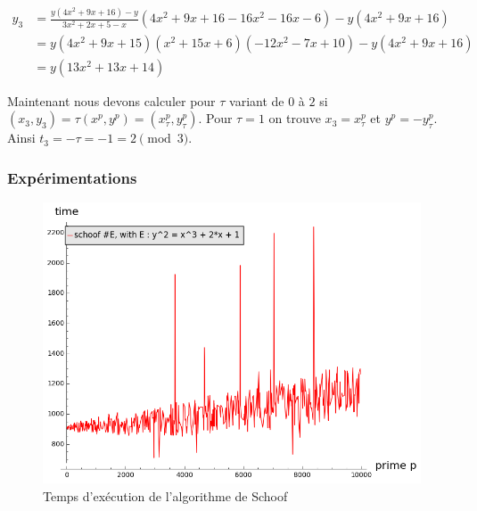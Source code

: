 \documentclass{article}
\begin{document}
\begin{align*}
y_3 &= \frac{y(4x^2+9x+16) - y}{3x^2 +2x +5 - x} (4x^2+9x+16 -  16x^2 - 16x - 6) - y(4x^2+9x+16) \\
	&= y(4x^2+9x+15)(x^2+15x+6)( -12x^2 - 7x +10 ) - y(4x^2+9x+16)\\
	&= y(13x^2 + 13x + 14)
\end{align*}

Maintenant nous devons calculer pour $\tau$ variant de $0$ à $2$ si $(x_3, y_3) = \tau (x^p, y^p)=(x_{\tau}^p, y_{\tau}^p)$. Pour $\tau = 1$ on trouve $x_3 = x_{\tau}^p$ et $y^p= - y_{\tau}^p$. Ainsi $t_3 = -\tau = -1 = 2 \pmod 3$. 

\newpage
\subsubsection{Expérimentations}

\begin{figure}[h!]
\includegraphics[scale=0.6]{pictures/schoof_cputime.png} 
\caption{Temps d'exécution de l'algorithme de Schoof}
\end{figure}
\end{document}
